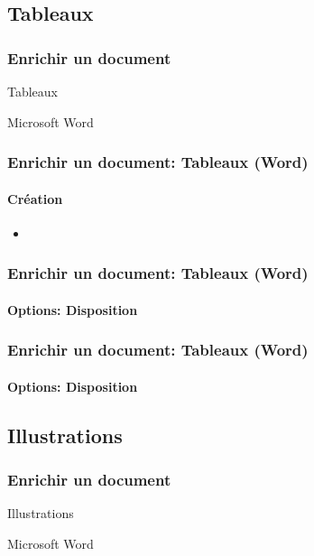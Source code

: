 \documentclass[xcolor=table]{beamer}
\begin{document}
\subsection{Tableaux}

\begin{frame}
\frametitle{Enrichir un document}

\begin{center}
	Tableaux 
	
	Microsoft Word
\end{center}

\end{frame}


\begin{frame}
\frametitle{Enrichir un document: Tableaux (Word)}
\framesubtitle{Création}

\begin{minipage}{0.70\textwidth}
	\begin{itemize}
		\item 
	\end{itemize}
\end{minipage}
\begin{minipage}{0.28\textwidth}	
\end{minipage}

\end{frame}

\begin{frame}[t]
\frametitle{Enrichir un document: Tableaux (Word)}
\framesubtitle{Options: Disposition}


\end{frame}

\begin{frame}[t]
\frametitle{Enrichir un document: Tableaux (Word)}
\framesubtitle{Options: Disposition}


\end{frame}


\subsection{Illustrations}

\begin{frame}
\frametitle{Enrichir un document}

\begin{center}
	Illustrations 
	
	Microsoft Word
\end{center}

\end{frame}
\end{document}
